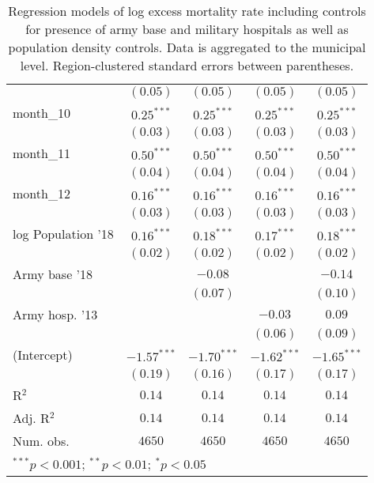\begin{table}[h!]
\begin{center}
\begin{small}
\begin{tabular}{l c c c c}
                   & $(0.05)$      & $(0.05)$      & $(0.05)$      & $(0.05)$      \\
month\_10          & $0.25^{***}$  & $0.25^{***}$  & $0.25^{***}$  & $0.25^{***}$  \\
                   & $(0.03)$      & $(0.03)$      & $(0.03)$      & $(0.03)$      \\
month\_11          & $0.50^{***}$  & $0.50^{***}$  & $0.50^{***}$  & $0.50^{***}$  \\
                   & $(0.04)$      & $(0.04)$      & $(0.04)$      & $(0.04)$      \\
month\_12          & $0.16^{***}$  & $0.16^{***}$  & $0.16^{***}$  & $0.16^{***}$  \\
                   & $(0.03)$      & $(0.03)$      & $(0.03)$      & $(0.03)$      \\
log Population '18 & $0.16^{***}$  & $0.18^{***}$  & $0.17^{***}$  & $0.18^{***}$  \\
                   & $(0.02)$      & $(0.02)$      & $(0.02)$      & $(0.02)$      \\
Army base '18      &               & $-0.08$       &               & $-0.14$       \\
                   &               & $(0.07)$      &               & $(0.10)$      \\
Army hosp. '13     &               &               & $-0.03$       & $0.09$        \\
                   &               &               & $(0.06)$      & $(0.09)$      \\
(Intercept)        & $-1.57^{***}$ & $-1.70^{***}$ & $-1.62^{***}$ & $-1.65^{***}$ \\
                   & $(0.19)$      & $(0.16)$      & $(0.17)$      & $(0.17)$      \\
\hline
R$^2$              & $0.14$        & $0.14$        & $0.14$        & $0.14$        \\
Adj. R$^2$         & $0.14$        & $0.14$        & $0.14$        & $0.14$        \\
Num. obs.          & $4650$        & $4650$        & $4650$        & $4650$        \\
\hline
\multicolumn{5}{l}{\tiny{$^{***}p<0.001$; $^{**}p<0.01$; $^{*}p<0.05$}}
\end{tabular}
\end{small}
\caption{Regression models of log excess mortality rate including controls for presence of army base and military hospitals as well as population density controls. Data is aggregated to the municipal level. Region-clustered standard errors between parentheses.}
\label{tab:armymodels}
\end{center}
\end{table}
